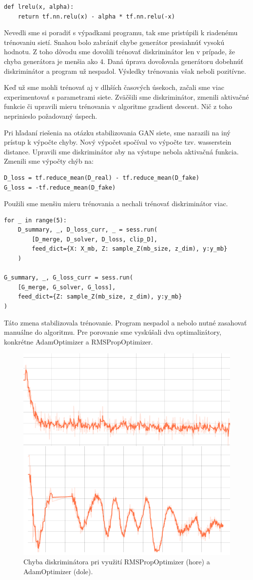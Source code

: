 \begin{verbatim}
def lrelu(x, alpha):
    return tf.nn.relu(x) - alpha * tf.nn.relu(-x)
\end{verbatim}

Nevedli sme si poradiť s výpadkami programu, tak sme pristúpili k riadenému trénovaniu sietí.
Snahou bolo zabrániť chybe generátor presiahnúť vysokú hodnotu.
Z toho dôvodu sme dovolili trénovať diskriminátor len v prípade, že chyba generátora je menšia ako 4.
Daná úprava dovoľovala generátoru dobehnúť diskriminátor a program už nespadol.
Výsledky trénovania však neboli pozitívne.

Keď už sme mohli trénovať aj v dlhších časových úsekoch, začali sme viac experimentovať s parametrami siete.
Zväčšili sme diskriminátor, zmenili aktivačné funkcie či upravili mieru trénovania v algoritme gradient descent.
Nič z toho neprinieslo požadovaný úspech.

Pri hľadaní riešenia na otázku stabilizovania GAN siete, sme narazili na iný prístup k výpočte chyby.
Nový výpočet spočíval vo výpočte tzv. wasserstein distance.
Upravili sme diskriminátor aby na výstupe nebola aktivačná funkcia.
Zmenili sme výpočty chýb na:

\begin{verbatim}
D_loss = tf.reduce_mean(D_real) - tf.reduce_mean(D_fake)
G_loss = -tf.reduce_mean(D_fake)
\end{verbatim}

Použili sme menšiu mieru trénovania a nechali trénovať diskriminátor viac.
\begin{verbatim}
for _ in range(5):
	D_summary, _, D_loss_curr, _ = sess.run(
		[D_merge, D_solver, D_loss, clip_D], 
		feed_dict={X: X_mb, Z: sample_Z(mb_size, z_dim), y:y_mb}
	)

G_summary, _, G_loss_curr = sess.run(
	[G_merge, G_solver, G_loss], 
	feed_dict={Z: sample_Z(mb_size, z_dim), y:y_mb}
)
\end{verbatim}

Táto zmena stabilizovala trénovanie.
Program nespadol a nebolo nutné zasahovať manuálne do algoritmu.
Pre porovanie sme vyskúšali dva optimalizátory, konkrétne AdamOptimizer a RMSPropOptimizer.

\begin{figure}[!ht] 
	\centering 
	\includegraphics[width=.4\textwidth]{figures/adam_vs_rms} 
	\caption{Chyba diskriminátora pri využití RMSPropOptimizer (hore) a AdamOptimizer (dole).}
	\label{a_vs_r}
\end{figure}

